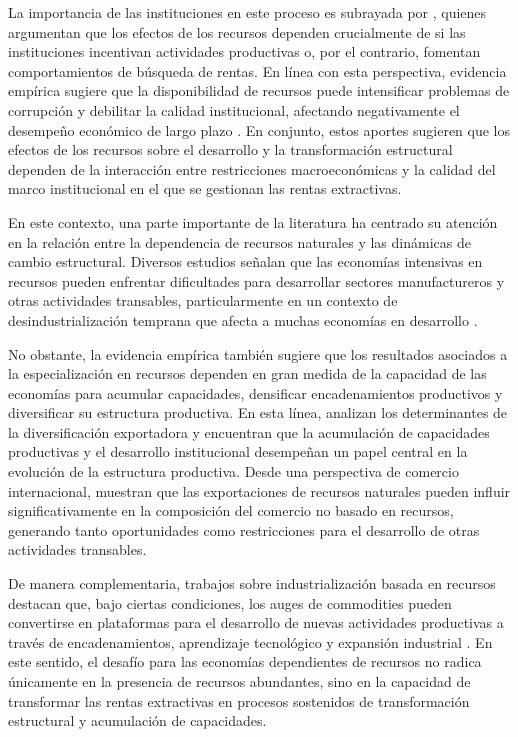 \documentclass[../../PTFM.tex]{subfiles}
\begin{document}
	La importancia de las instituciones en este proceso es subrayada por \textcite{Mehlum2006}, quienes argumentan que los efectos de los recursos dependen crucialmente de si las instituciones incentivan actividades productivas o, por el contrario, fomentan comportamientos de búsqueda de rentas. En línea con esta perspectiva, evidencia empírica sugiere que la disponibilidad de recursos puede intensificar problemas de corrupción y debilitar la calidad institucional, afectando negativamente el desempeño económico de largo plazo \parencite{Bhattacharyya2010}. En conjunto, estos aportes sugieren que los efectos de los recursos sobre el desarrollo y la transformación estructural dependen de la interacción entre restricciones macroeconómicas y la calidad del marco institucional en el que se gestionan las rentas extractivas.

	En este contexto, una parte importante de la literatura ha centrado su atención en la relación entre la dependencia de recursos naturales y las dinámicas de cambio estructural. Diversos estudios señalan que las economías intensivas en recursos pueden enfrentar dificultades para desarrollar sectores manufactureros y otras actividades transables, particularmente en un contexto de desindustrialización temprana que afecta a muchas economías en desarrollo \textcite{Rodrik2016}.

	No obstante, la evidencia empírica también sugiere que los resultados asociados a la especialización en recursos dependen en gran medida de la capacidad de las economías para acumular capacidades, densificar encadenamientos productivos y diversificar su estructura productiva. En esta línea, \textcite{Agosin2012} analizan los determinantes de la diversificación exportadora y encuentran que la acumulación de capacidades productivas y el desarrollo institucional desempeñan un papel central en la evolución de la estructura productiva. Desde una perspectiva de comercio internacional, \textcite{Harding2016} muestran que las exportaciones de recursos naturales pueden influir significativamente en la composición del comercio no basado en recursos, generando tanto oportunidades como restricciones para el desarrollo de otras actividades transables.

	De manera complementaria, trabajos sobre industrialización basada en recursos destacan que, bajo ciertas condiciones, los auges de commodities pueden convertirse en plataformas para el desarrollo de nuevas actividades productivas a través de encadenamientos, aprendizaje tecnológico y expansión industrial \parencite{Morris2013}. En este sentido, el desafío para las economías dependientes de recursos no radica únicamente en la presencia de recursos abundantes, sino en la capacidad de transformar las rentas extractivas en procesos sostenidos de transformación estructural y acumulación de capacidades.
\end{document}
